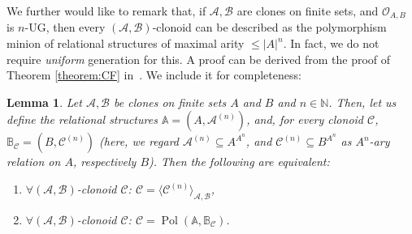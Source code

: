 \documentclass[11pt]{amsart}
\theoremstyle{plain}
\newtheorem{lemma}[thm]{Lemma}
\theoremstyle{definition}
\newcommand{\N}{{\mathbb N}}
\DeclareMathOperator{\Pol}{Pol}
\newcommand{\clone}[1]{\mathcal{#1}}
\newcommand{\clonoid}[1]{\mathcal{#1}}
\newcommand{\clodC}{\clonoid{C}}
\newcommand{\clodO}{\clonoid{O}}
\newcommand{\cloA}{\clone{A}}
\newcommand{\cloB}{\clone{B}}
\newcommand{\cloC}{\clone{C}}
\begin{document}
We further would like to remark that, if $\cloA,\cloB$ are clones on finite sets, and $\clodO_{A,B}$ is $n$-UG, then every $(\cloA,\cloB)$-clonoid can be described as the polymorphism minion of relational structures of maximal arity $\leq |A|^n$. In fact, we do not require \emph{uniform} generation for this. A proof can be derived from the proof of Theorem \ref{theorem:CF} in~\cite{CF-clonoids}. We include it for completeness:

\begin{lemma} \label{lemma:fingen}
Let $\cloA, \cloB$ be clones on finite sets $A$ and $B$ and $n \in \N$. Then, let us define the relational structures $\mathbb A = (A,\cloA^{(n)})$, and, for every clonoid $\cloC$,  $\mathbb B_{\cloC} = (B,\cloC^{(n)})$ (here, we regard $\cloA^{(n)} \subseteq A^{A^n}$, and $\cloC^{(n)} \subseteq B^{A^n}$ as $A^n$-ary relation on $A$, respectively $B$). Then the following are equivalent:
\begin{enumerate}
\item $\forall (\cloA,\cloB)$-clonoid $\clodC$: $\clodC = \langle \clodC^{(n)} \rangle_{\cloA,\cloB}$,
\item $\forall (\cloA,\cloB)$-clonoid $\clodC$: $\clodC = \Pol(\mathbb A,\mathbb B_{\cloC})$.
\end{enumerate}
\end{lemma}
\end{document}
